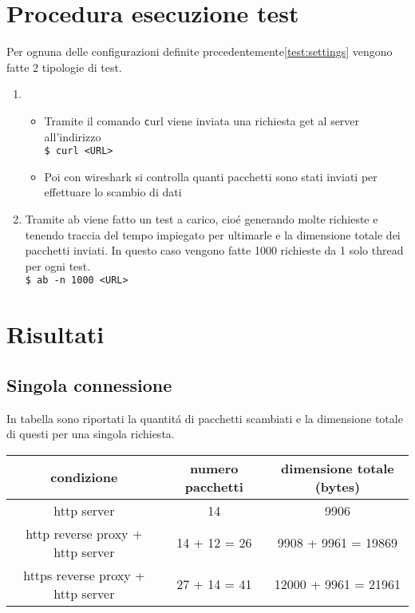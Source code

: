 \section{Procedura esecuzione test}
Per ognuna delle configurazioni definite precedentemente\ref{test:settings} vengono fatte 2 tipologie di test.
\begin{enumerate}
  \item
    \begin{itemize}
      \item Tramite il comando \texttt curl viene inviata una richiesta get al server all'indirizzo\\
        \texttt{\$ curl <URL>}
        \item Poi con wireshark si controlla quanti pacchetti sono stati inviati per effettuare lo scambio di dati

    \end{itemize}
  \item Tramite ab viene fatto un test a carico, cioé generando molte richieste e tenendo traccia del tempo impiegato per ultimarle e la dimensione totale dei pacchetti inviati. In questo caso vengono fatte 1000 richieste da 1 solo thread per ogni test.\\
    \texttt{\$ ab -n 1000 <URL>}

\end{enumerate}

\section{Risultati}
\subsection{Singola connessione}
In tabella sono riportati la quantitá di pacchetti scambiati e la dimensione totale di questi per una singola richiesta.
\begin{center}
  \begin{tabular}{|c|c|c|}
    \hline
    condizione & numero pacchetti & dimensione totale (bytes) \\
    \hline
    \hline
    http server & 14 & 9906 \\
    \hline
    http reverse proxy + http server & 14 + 12 = 26 & 9908 + 9961 = 19869 \\
    \hline
    https reverse proxy + http server & 27 + 14 = 41 & 12000 + 9961 = 21961 \\
    \hline
  \end{tabular}
\end{center}
\begin{center}
\end{center}


